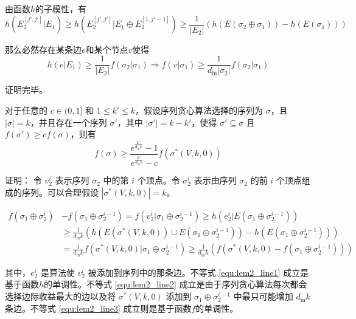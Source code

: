由函数$h$的子模性，有
\begin{equation}
h(E_2^{[j',j']} | E_1) \ge h(E_2^{[j',j']} | E_1 \oplus E_2^{[1,j'-1]}) \ge \frac{1}{|E_2|}(h(E(\sigma_2 \oplus \sigma_1)) - h(E(\sigma_1)))
\end{equation}

那么必然存在某条边$e$和某个节点$v$使得
\begin{equation}
h(e|E_1) \ge \frac{1}{|E_2|}f(\sigma_2|\sigma_1) \Longrightarrow
f(v|\sigma_1) \ge \frac{1}{d_{\text{in}}|\sigma_2|}f(\sigma_2|\sigma_1)
\end{equation}

\noindent 证明完毕。

\begin{lemma}
\label{lem:lem2}
对于任意的 $c \in (0,1]$ 和 $1 \le k' \le k$，假设序列贪心算法选择的序列为 $\sigma$，且 $|\sigma| = k$，并且存在一个序列 $\sigma'$，其中 $|\sigma'| = k-k'$，使得 $\sigma' \subseteq \sigma$ 且 $f(\sigma') \ge c f(\sigma)$，则有
\begin{equation}
 f(\sigma) \ge \frac{e^{\frac{k'}{d_{\text{in}}k}}-1} {e^{\frac{k'}{d_{\text{in}}k}}-c} f(\sigma^*(V,k,0))
\end{equation}
\end{lemma}

\noindent 证明：
令 $v_2^i$ 表示序列 $\sigma_2$ 中的第 $i$ 个顶点。令 $\sigma_2^i$ 表示由序列 $\sigma_2$ 的前 $i$ 个顶点组成的序列。可以合理假设 $|\sigma^*(V,k,0)|=k$。

\begin{align}
f(\sigma_1 \oplus \sigma_2^i) &- f(\sigma_1 \oplus \sigma_2^{i-1}) = f(v_2^i|\sigma_1 \oplus \sigma_2^{i-1}) \ge h(e_2^i|E(\sigma_1 \oplus \sigma_2^{i-1})) \label{equ:lem2_line1}\\
& \ge \frac{1}{d_{\text{in}}k} (h(E(\sigma^*(V,k,0)) \cup E(\sigma_1 \oplus \sigma_2^{i-1})) -h(E(\sigma_1 \oplus \sigma_2^{i-1}))) \label{equ:lem2_line2}\\
& = \frac{1}{d_{\text{in}}k} f(\sigma^*(V,k,0)|\sigma_1 \oplus \sigma_2^{i-1}) \ge \frac{1}{d_{\text{in}}k} (f(\sigma^*(V,k,0) - f(\sigma_1 \oplus \sigma_2^{i-1}))) \label{equ:lem2_line3}
\end{align}

其中，$e_2^i$ 是算法使 $v_2^i$ 被添加到序列中的那条边。不等式 \ref{equ:lem2_line1} 成立是基于函数$h$的单调性。不等式 \ref{equ:lem2_line2} 成立是由于序列贪心算法每次都会选择边际收益最大的边以及将 $\sigma^*(V,k,0)$ 添加到 $\sigma_1 \oplus \sigma_2^{i-1}$ 中最只可能增加 $d_{\text{in}}k$ 条边。不等式 \ref{equ:lem2_line3} 成立则是基于函数$f$的单调性。

